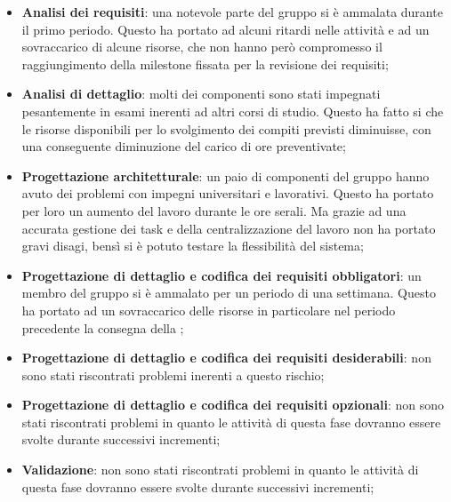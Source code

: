 			\begin{itemize}
				\item \textbf{Analisi dei requisiti}: una notevole parte del gruppo si è ammalata durante il primo periodo. Questo ha portato ad alcuni ritardi nelle attività e ad un sovraccarico di alcune risorse, che non hanno però compromesso il raggiungimento della milestone fissata per la revisione dei requisiti;
				\item \textbf{Analisi di dettaglio}: molti dei componenti sono stati impegnati pesantemente in esami inerenti ad altri corsi di studio. Questo ha fatto si che le risorse disponibili per lo svolgimento dei compiti previsti diminuisse, con una conseguente diminuzione del carico di ore preventivate;
				\item \textbf{Progettazione architetturale}: un paio di componenti del gruppo hanno avuto dei problemi con impegni universitari e lavorativi. Questo ha portato per loro un aumento del lavoro durante le ore serali. Ma grazie ad una accurata gestione dei task e della centralizzazione del lavoro non ha portato gravi disagi, bensì si è potuto testare la flessibilità del sistema;
				\item \textbf{Progettazione di dettaglio e codifica dei requisiti obbligatori}: un membro del gruppo si è ammalato per un periodo di una settimana. Questo ha portato ad un sovraccarico delle risorse in particolare nel periodo precedente la consegna della \RPmin;
				\item \textbf{Progettazione di dettaglio e codifica dei requisiti desiderabili}: non sono stati riscontrati problemi inerenti a questo rischio;
				\item \textbf{Progettazione di dettaglio e codifica dei requisiti opzionali}: non sono stati riscontrati problemi in quanto le attività di questa fase dovranno essere svolte durante successivi incrementi;
				\item \textbf{Validazione}: non sono stati riscontrati problemi in quanto le attività di questa fase dovranno essere svolte durante successivi incrementi;
			\end{itemize}

